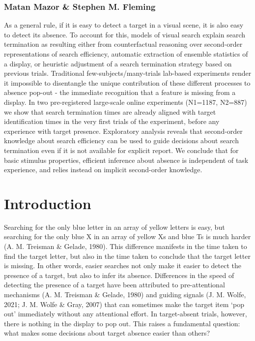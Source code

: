 \documentclass[12pt,twoside]{reedthesis}
\begin{document}
\hypertarget{matan-mazor-stephen-m.-fleming}{%
\subsubsection*{Matan Mazor \& Stephen M. Fleming}\label{matan-mazor-stephen-m.-fleming}}

As a general rule, if it is easy to detect a target in a visual scene, it is also easy to detect its absence. To account for this, models of visual search explain search termination as resulting either from counterfactual reasoning over second-order representations of search efficiency, automatic extraction of ensemble statistics of a display, or heuristic adjustment of a search termination strategy based on previous trials. Traditional few-subjects/many-trials lab-based experiments render it impossible to disentangle the unique contribution of these different processes to absence pop-out - the immediate recognition that a feature is missing from a display. In two pre-registered large-scale online experiments (N1=1187, N2=887) we show that search termination times are already aligned with target identification times in the very first trials of the experiment, before any experience with target presence. Exploratory analysis reveals that second-order knowledge about search efficiency can be used to guide decisions about search termination even if it is not available for explicit report. We conclude that for basic stimulus properties, efficient inference about absence is independent of task experience, and relies instead on implicit second-order knowledge.

\hypertarget{introduction-1}{%
\section{Introduction}\label{introduction-1}}

Searching for the only blue letter in an array of yellow letters is easy, but searching for the only blue X in an array of yellow Xs and blue Ts is much harder (A. M. Treisman \& Gelade, 1980). This difference manifests in the time taken to find the target letter, but also in the time taken to conclude that the target letter is missing. In other words, easier searches not only make it easier to detect the presence of a target, but also to infer its absence. Differences in the speed of detecting the presence of a target have been attributed to pre-attentional mechanisms (A. M. Treisman \& Gelade, 1980) and guiding signals (J. M. Wolfe, 2021; J. M. Wolfe \& Gray, 2007) that can sometimes make the target item `pop out' immediately without any attentional effort. In target-absent trials, however, there is nothing in the display to pop out. This raises a fundamental question: what makes some decisions about target absence easier than others?
\end{document}
